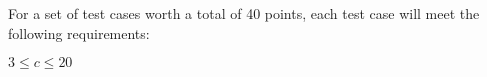 For a set of test cases worth a total of 40 points, each test case will meet the following requirements:

$3 \le c \le 20$